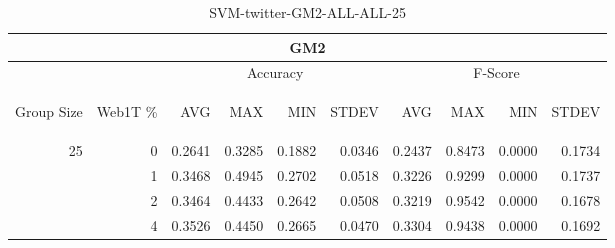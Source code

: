 \begin{center}
\begin{table}[htbp] 
 \begin{center}
\begin{tabular}{ | r | r | r | r | r | r | r | r | r | r |}
\hline
\multicolumn{10}{|c|}{GM2}\\
\hline
 & & \multicolumn{4}{|c|}{Accuracy} & \multicolumn{4}{|c|}{F-Score}\\ \cline{3-10}
\begin{sideways}Group Size\end{sideways} & \begin{sideways}Web1T \%\end{sideways} & \begin{sideways}AVG\end{sideways} & \begin{sideways}MAX\end{sideways} & \begin{sideways}MIN\end{sideways} & \begin{sideways}STDEV\end{sideways} & \begin{sideways}AVG\end{sideways} & \begin{sideways}MAX\end{sideways} & \begin{sideways}MIN\end{sideways} & \begin{sideways}STDEV\end{sideways}\\
\hline
\multirow{3}{*}{25}
 & 0 & 0.2641 & 0.3285 & 0.1882 & 0.0346 & 0.2437 & 0.8473 & 0.0000 & 0.1734\\ \cline{2-10}
 & 1 & 0.3468 & 0.4945 & 0.2702 & 0.0518 & 0.3226 & 0.9299 & 0.0000 & 0.1737\\ \cline{2-10}
 & 2 & 0.3464 & 0.4433 & 0.2642 & 0.0508 & 0.3219 & 0.9542 & 0.0000 & 0.1678\\ \cline{2-10}
 & 4 & 0.3526 & 0.4450 & 0.2665 & 0.0470 & 0.3304 & 0.9438 & 0.0000 & 0.1692\\ \cline{2-10}
\hline
\end{tabular}
\caption{SVM-twitter-GM2-ALL-ALL-25}
\label{table:SVM-twitter-GM2-ALL-ALL-25}
\end{center}
 \end{table}
\end{center}

